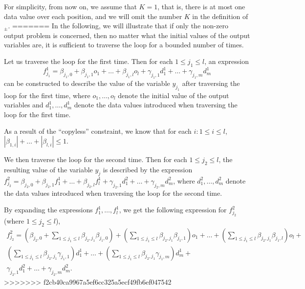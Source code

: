For simplicity, from now on, we assume that $K=1$, that is, there is at most one data value over each position, and we will omit the number $K$ in the definition of \SDSIT$_{\pm}$.
=======
In the following, we will illustrate that if only the non-zero output problem is concerned, then no matter what the initial values of the output variables are, it is sufficient to traverse the loop for a bounded number of times.


Let us traverse the loop for the first time. Then for each $1 \le j_1 \le l$, an expression 
\[f^1_{j_1} = \beta_{j_1,0} + \beta_{j_1,1} o_1 + \dots + \beta_{j_1,l} o_l + \gamma_{j_1,1} d^1_1 + \dots + \gamma_{j_1,m} d^1_m\] 
can be constructed to describe the value of the variable $y_{j_1}$ after traversing the loop for the first time, where $o_1,\dots,o_l$ denote the initial value of the output variables and $d^1_1, \dots, d^1_m$ denote the data values introduced when traversing the loop for the first time. 

As a result of the ``copyless'' constraint, we know that for each $i: 1 \le i \le l$, $|\beta_{1,i}|+\dots +|\beta_{l,i}| \le 1$.


We then traverse the loop for the second time. Then for each $1 \le j_2 \le l$,  the resulting value of the variable $y_{j}$ is described by the expression $f^2_{j_2} = \beta_{j_2,0} + \beta_{j_2,1} f^1_1 + \dots + \beta_{j_2,l} f^1_l + \gamma_{j_2,1} d^2_1 + \dots + \gamma_{j_2,m} d^2_m$, where $d^2_1, \dots, d^2_m$ denote the data values introduced when traversing the loop for the second time. 

By expanding the expressions $f^1_1,\dots, f^1_l$, we get the following expression for $f^2_{j_2}$ (where $1 \le j_2 \le l$),
\[
\begin{array}{l}
f^2_{j_2} = (\beta_{j_2,0} + \sum \limits_{1 \le j_1 \le l} \beta_{j_2,j_1} \beta_{j_1, 0}) + (\sum \limits_{1 \le j_1 \le l}\beta_{j_2,j_1}\beta_{j_1,1}) o_1 + \dots + (\sum \limits_{1 \le j_1 \le l}\beta_{j_2,j_1}\beta_{j_1,l}) o_l +  \\
(\sum \limits_{1 \le j_1 \le l}\beta_{j_2,j_1}\gamma_{j_1,1}) d^1_1 +\dots + (\sum \limits_{1 \le j_1 \le l}\beta_{j_2,j_1}\gamma_{j_1,m}) d^1_m  + \\
\gamma_{j_2,1} d^2_1 + \dots + \gamma_{j_2,m} d^2_m.
\end{array}
\]
>>>>>>> f2cb40ca9967a5ef6cc325a5ecf49fb6ef047542

